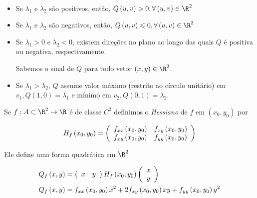\documentclass[11pt, oneside, a4paper]{gsm-l}
\begin{document}
\

\begin{itemize}
  \item Se $\lambda _1$ e $\lambda _2$ são positivos, então, $Q\left( {u,v} \right) > 0,\forall \left( {u,v} \right) \in \R^2$
  \item Se $\lambda _1$ e $\lambda _2$ são negativos, então, $Q\left( {u,v} \right) \leqslant 0,\forall \left( {u,v} \right) \in \R^2$
  \item Se $\lambda _1 > 0$ e $\lambda _2 < 0$, existem direções no plano ao longo das quais $Q$ é positiva ou negativa, respectivamente.

Sabemos o sinal de $Q$ para todo vetor $\left( {x,y} \right) \in \R^2$.
  \item Se $\lambda _1 > \lambda _2$, $Q$ assume valor máximo (restrito ao círculo unitário) em \\
$v_1 ,Q\left( {1,0} \right) = \lambda _1$ e mínimo em $v_2 ,Q\left( {0,1} \right) = \lambda _2$.
\end{itemize}


\begin{defi}[Hessiano]
    Se $f:A \subset \R^2 \to \R$ é de classe $C^2$ definimos o \textit{Hessiano} de $f$ em $\left( {x_0 ,y_0 } \right)$ por

\[
H_f \left( {x_0 ,y_0 } \right) = \left( {\begin{array}{*{20}c}
{f_{xx} \left( {x_0 ,y_0 } \right)} & {f_{xy} \left( {x_0 ,y_0 } \right)}  \\
{f_{xy} \left( {x_0 ,y_0 } \right)} & {f_{yy} \left( {x_0 ,y_0 } \right)}  \\

\end{array} } \right)
\]

\end{defi}

Ele define uma forma quadrática em $\R^2$

\[
\begin{gathered}
Q_f \left( {x,y} \right) = \left( {\begin{array}{*{20}c}
x & y  \\

\end{array} } \right)H_f \left( {x_0 ,y_0 } \right)\left( {\begin{array}{*{20}c}
x  \\
y  \\

\end{array} } \right) \hfill \\
  Q_f \left( {x,y} \right) = f_{xx} \left( {x_0 ,y_0 } \right)x^2  + 2f_{xy} \left( {x_0 ,y_0 } \right)xy + f_{yy} \left( {x_0 ,y_0 } \right)y^2  \hfill \\
\end{gathered}
\]
\end{document}
